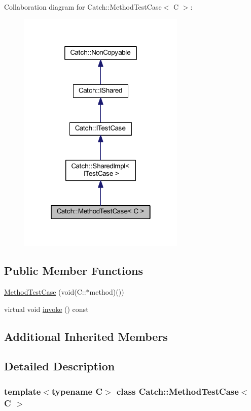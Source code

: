 Collaboration diagram for Catch\+:\+:Method\+Test\+Case$<$ C $>$\+:\nopagebreak
\begin{figure}[H]
\begin{center}
\leavevmode
\includegraphics[width=226pt]{class_catch_1_1_method_test_case__coll__graph}
\end{center}
\end{figure}
\subsection*{Public Member Functions}
\begin{DoxyCompactItemize}
\item 
\hyperlink{class_catch_1_1_method_test_case_a7b043b85dae371358255dd9dc6582e7b}{Method\+Test\+Case} (void(C\+::$\ast$method)())
\item 
virtual void \hyperlink{class_catch_1_1_method_test_case_a4e2263cfa0646f2980768328cb372793}{invoke} () const
\end{DoxyCompactItemize}
\subsection*{Additional Inherited Members}


\subsection{Detailed Description}
\subsubsection*{template$<$typename C$>$\newline
class Catch\+::\+Method\+Test\+Case$<$ C $>$}




